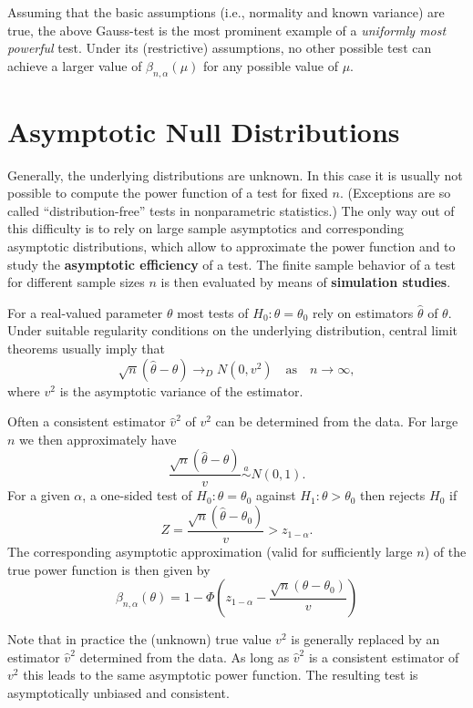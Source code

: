 \documentclass[]{book}
\theoremstyle{definition}
\theoremstyle{definition}
\theoremstyle{definition}
\theoremstyle{remark}
\begin{document}
Assuming that the basic assumptions (i.e., normality and known variance) are true, the above Gauss-test is the most prominent example of a \emph{uniformly most powerful} test. Under its (restrictive) assumptions, no other possible test can achieve a larger value of \(\beta_{n,\alpha}(\mu)\) for any possible value of \(\mu\).

\hypertarget{asymptotic-null-distributions}{%
\section{Asymptotic Null Distributions}\label{asymptotic-null-distributions}}

Generally, the underlying distributions are unknown. In this case it is usually not possible to compute the power function of a test for fixed \(n\). (Exceptions are so called ``distribution-free'' tests in nonparametric statistics.) The only way out of this difficulty is to rely on large sample asymptotics and corresponding asymptotic distributions, which allow to approximate the power function and to study the \textbf{asymptotic efficiency} of a test. The finite sample behavior of a test for different sample sizes \(n\) is then evaluated by means of \textbf{simulation studies}.

For a real-valued parameter \(\theta\) most tests of \(H_0:\theta=\theta_0\) rely on estimators \(\hat\theta\) of \(\theta\). Under suitable regularity conditions on the underlying distribution, central limit theorems usually imply that
\[\sqrt{n}(\hat\theta - \theta)\rightarrow_D N(0,v^2)\quad\text{as}\quad n\rightarrow\infty,\]
where \(v^2\) is the asymptotic variance of the estimator.

Often a consistent estimator \(\hat v^2\) of \(v^2\) can be determined from the data. For large \(n\) we then approximately have
\[\frac{\sqrt{n}(\hat\theta - \theta)}{ v}\overset{a}{\sim} N(0,1).\]
For a given \(\alpha\), a one-sided test of \(H_0:\theta=\theta_0\) against \(H_1:\theta>\theta_0\) then rejects \(H_0\) if
\[
Z=\frac{\sqrt{n} (\hat\theta -\theta_0)}{v}>z_{1-\alpha}.
\]
The corresponding asymptotic approximation (valid for sufficiently large \(n\)) of the true power function is then given by
\[
\beta_{n,\alpha}(\theta) = 1-\Phi\left(z_{1-\alpha}-\frac{\sqrt{n} (\theta -\theta_0)}{v}\right)
\]

Note that in practice the (unknown) true value \(v^2\) is generally replaced by an estimator \(\hat v^2\) determined from the data. As long as \(\hat v^2\) is a consistent estimator of \(v^2\) this leads to the same asymptotic power function. The resulting test is asymptotically unbiased and consistent.
\end{document}
